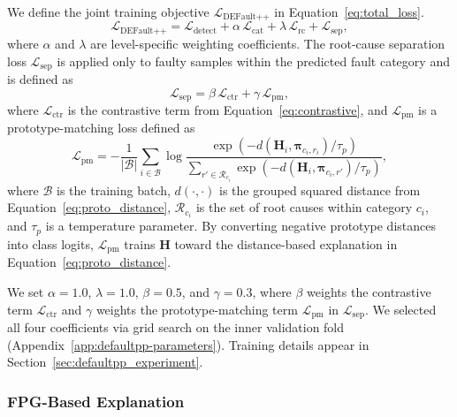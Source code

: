 We define the joint training objective $\mathcal{L}_{\text{DEFault++}}$ in Equation~\ref{eq:total_loss}.
\begin{equation}
\mathcal{L}_{\text{DEFault++}} = \mathcal{L}_{\text{detect}} + \alpha \, \mathcal{L}_{\text{cat}} + \lambda \, \mathcal{L}_{\text{rc}} + \mathcal{L}_{\text{sep}},
\label{eq:total_loss}
\end{equation}
where $\alpha$ and $\lambda$ are level-specific weighting coefficients. The root-cause separation loss $\mathcal{L}_{\text{sep}}$ is applied only to faulty samples within the predicted fault category and is defined as
\begin{equation}
\mathcal{L}_{\text{sep}} = \beta \, \mathcal{L}_{\text{ctr}} + \gamma \, \mathcal{L}_{\text{pm}},
\label{eq:separation_loss}
\end{equation}
where $\mathcal{L}_{\text{ctr}}$ is the contrastive term from Equation~\ref{eq:contrastive}, and $\mathcal{L}_{\text{pm}}$ is a prototype-matching loss defined as
\begin{equation}
\mathcal{L}_{\text{pm}} = -\frac{1}{|\mathcal{B}|} \sum_{i \in \mathcal{B}} \log \frac{\exp(-d(\mathbf{H}_i, \symbf{\pi}_{c_i, r_i}) / \tau_p)}{\sum_{r' \in \mathcal{R}_{c_i}} \exp(-d(\mathbf{H}_i, \symbf{\pi}_{c_i, r'}) / \tau_p)},
\label{eq:proto_matching}
\end{equation}
where $\mathcal{B}$ is the training batch, $d(\cdot, \cdot)$ is the grouped squared distance from Equation~\ref{eq:proto_distance}, $\mathcal{R}_{c_i}$ is the set of root causes within category $c_i$, and $\tau_p$ is a temperature parameter. By converting negative prototype distances into class logits, $\mathcal{L}_{\text{pm}}$ trains $\mathbf{H}$ toward the distance-based explanation in Equation~\ref{eq:proto_distance}.

We set $\alpha = 1.0$, $\lambda = 1.0$, $\beta = 0.5$, and $\gamma = 0.3$, where $\beta$ weights the contrastive term $\mathcal{L}_{\text{ctr}}$ and $\gamma$ weights the prototype-matching term $\mathcal{L}_{\text{pm}}$ in $\mathcal{L}_{\text{sep}}$. We selected all four coefficients via grid search on the inner validation fold (Appendix~\ref{app:defaultpp-parameters}). Training details appear in Section~\ref{sec:defaultpp_experiment}.

\subsubsection{FPG-Based Explanation}
\label{sec:defaultpp_explainability}

